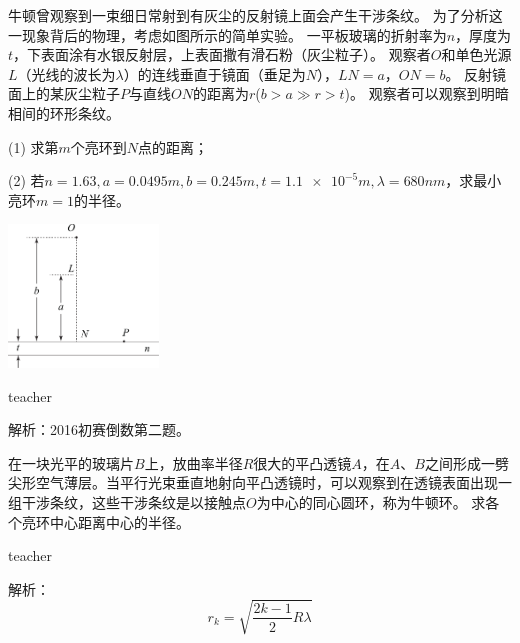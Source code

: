 \begin{example}
	牛顿曾观察到一束细日常射到有灰尘的反射镜上面会产生干涉条纹。
	为了分析这一现象背后的物理，考虑如图所示的简单实验。
	一平板玻璃的折射率为$n$，厚度为$t$，下表面涂有水银反射层，上表面撒有滑石粉（灰尘粒子）。
	观察者$O$和单色光源$L$（光线的波长为$\lambda$）的连线垂直于镜面（垂足为$N$），$LN=a$，$ON=b$。
	反射镜面上的某灰尘粒子$P$与直线$ON$的距离为$r$($b>a\gg r>t$)。
	观察者可以观察到明暗相间的环形条纹。
	
	(1) 求第$m$个亮环到$N$点的距离；
	
	(2) 若$n=1.63, a=0.0495\si{m},b=0.245\si{m},t = \num{1.1e-5}\si{m},\lambda=680\si{nm}$，求最小亮环$m=1$的半径。
			\begin{flushright}
				\includegraphics[width = 0.3\textwidth]{images/wave-optics-8.pdf} 
			\end{flushright}
	\begin{taggedblock}{teacher}
		
		解析：2016初赛倒数第二题。
	\end{taggedblock}
\end{example}%


\begin{example}
	在一块光平的玻璃片$ B上$，放曲率半径$ R$很大的平凸透镜$ A$，在$ A$、$B$之间形成一劈尖形空气薄层。当平行光束垂直地射向平凸透镜时，可以观察到在透镜表面出现一组干涉条纹，这些干涉条纹是以接触点$ O$为中心的同心圆环，称为牛顿环。
	求各个亮环中心距离中心的半径。
	\begin{taggedblock}{teacher}
		
		解析：\[
		r_k = \sqrt{\frac{2k-1}{2}R\lambda}
		\]
	\end{taggedblock}
\end{example}%

